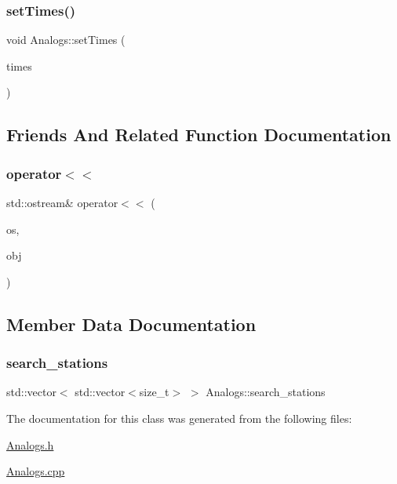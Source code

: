 \mbox{\label{class_analogs_a347217a824838542cc3440bc5362e535}} 
\subsubsection{\texorpdfstring{set\+Times()}{setTimes()}}
{\footnotesize\ttfamily void Analogs\+::set\+Times (\begin{DoxyParamCaption}\item[{\mbox{\hyperlink{classanen_time_1_1_times}{anen\+Time\+::\+Times}}}]{times }\end{DoxyParamCaption})}



\subsection{Friends And Related Function Documentation}
\mbox{\label{class_analogs_a8b1c62cad49a019ac1733168d179cf73}} 
\subsubsection{\texorpdfstring{operator$<$$<$}{operator<<}}
{\footnotesize\ttfamily std\+::ostream\& operator$<$$<$ (\begin{DoxyParamCaption}\item[{std\+::ostream \&}]{os,  }\item[{const \mbox{\hyperlink{class_analogs}{Analogs}} \&}]{obj }\end{DoxyParamCaption})\hspace{0.3cm}{\ttfamily [friend]}}



\subsection{Member Data Documentation}
\mbox{\label{class_analogs_a32cff6e74cb1c15dc7fd769ab9835bca}} 
\subsubsection{\texorpdfstring{search\+\_\+stations}{search\_stations}}
{\footnotesize\ttfamily std\+::vector$<$ std\+::vector$<$size\+\_\+t$>$ $>$ Analogs\+::search\+\_\+stations}



The documentation for this class was generated from the following files\+:\begin{DoxyCompactItemize}
\item 
\mbox{\hyperlink{_analogs_8h}{Analogs.\+h}}\item 
\mbox{\hyperlink{_analogs_8cpp}{Analogs.\+cpp}}\end{DoxyCompactItemize}
